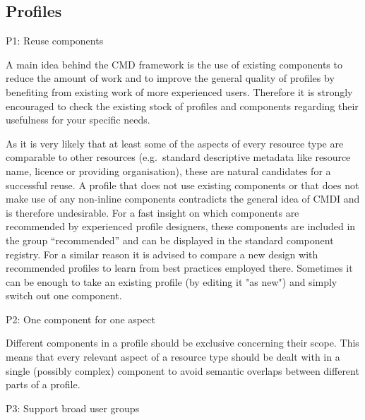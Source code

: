 \subsection{Profiles}\label{profiles}

P1: Reuse components

 

A main idea behind the CMD framework is the use of existing components to reduce the amount of work and to improve the general quality of profiles by benefiting from existing work of more experienced users. Therefore it is strongly encouraged to check the existing stock of profiles and components regarding their usefulness for your specific needs.

\begin{workinprogress}
As it is very likely that at least some of the aspects of every resource type are comparable to other resources (e.g.~standard descriptive metadata like resource name, licence or providing organisation), these are natural candidates for a successful reuse. A profile that does not use existing components or that does not make use of any non-inline components contradicts the general idea of CMDI and is therefore undesirable. For a fast insight on which components are recommended by experienced profile designers, these components are included in the
group ``recommended'' and can be displayed in the standard component registry. 
For a similar reason it is advised to compare a new design with recommended profiles to learn from best practices employed there. Sometimes it can be enough to take an existing profile (by editing it "as new") and simply switch out one component.

\end{workinprogress}


P2: One component for one aspect


Different components in a profile should be exclusive concerning their scope. This means that every relevant aspect of a resource type should be dealt with in a single (possibly complex) component to avoid semantic overlaps between different parts of a profile.

P3: Support broad user groups

